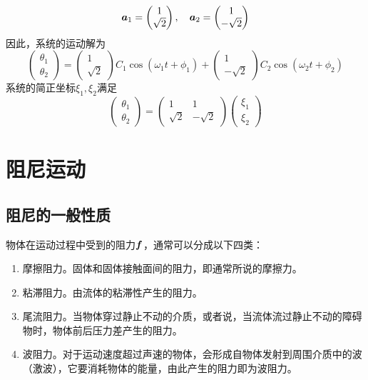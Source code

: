\begin{example}[双摆]
\begin{equation*}
	\boldsymbol{a}_1 = \begin{pmatrix} 1 \\ \sqrt{2} \end{pmatrix},\quad \boldsymbol{a}_2 = \begin{pmatrix} 1 \\ -\sqrt{2} \end{pmatrix}
\end{equation*}
因此，系统的运动解为
\begin{equation*}
	\begin{pmatrix} \theta_1 \\ \theta_2 \end{pmatrix} = \begin{pmatrix} 1 \\ \sqrt{2} \end{pmatrix} C_1 \cos (\omega_1 t+\phi_1) + \begin{pmatrix} 1 \\ -\sqrt{2} \end{pmatrix} C_2 \cos (\omega_2 t+\phi_2)
\end{equation*}
系统的简正坐标$\xi_1,\xi_2$满足
\begin{equation*}
	\begin{pmatrix} \theta_1 \\ \theta_2 \end{pmatrix} = \begin{pmatrix} 1 & 1 \\ \sqrt{2} & -\sqrt{2} \end{pmatrix} \begin{pmatrix} \xi_1 \\ \xi_2 \end{pmatrix}
\end{equation*}
\end{example}

\section{阻尼运动}

\subsection{阻尼的一般性质}

物体在运动过程中受到的阻力$\boldsymbol{f}$，通常可以分成以下四类：
\begin{enumerate}
	\item {\heiti 摩擦阻力}。固体和固体接触面间的阻力，即通常所说的摩擦力。
	\item {\heiti 粘滞阻力}。由流体的粘滞性产生的阻力。
	\item {\heiti 尾流阻力}。当物体穿过静止不动的介质，或者说，当流体流过静止不动的障碍物时，物体前后压力差产生的阻力。
	\item {\heiti 波阻力}。对于运动速度超过声速的物体，会形成自物体发射到周围介质中的波（激波），它要消耗物体的能量，由此产生的阻力即为波阻力。
\end{enumerate}

